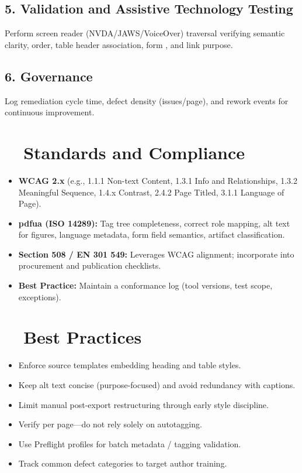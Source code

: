 \subsection*{5. Validation and Assistive Technology Testing}
Perform screen reader (NVDA/JAWS/VoiceOver) traversal verifying semantic clarity, order, table header association, form , and link purpose.
\subsection*{6. Governance}
Log remediation cycle time, defect density (issues/page), and rework events for continuous improvement.

\section{~~Standards and Compliance}\label{ch17:sec:standards-compliance}
\begin{itemize}
	\item \textbf{WCAG 2.x} (e.g., 1.1.1 Non-text Content, 1.3.1 Info and Relationships, 1.3.2 Meaningful Sequence, 1.4.x Contrast, 2.4.2 Page Titled, 3.1.1 Language of Page).
	\item \textbf{\gls{pdfua} (ISO 14289):} Tag tree completeness, correct role mapping, alt text for figures, language metadata, form field semantics, artifact classification.
	\item \textbf{Section 508 / EN 301 549:} Leverages WCAG alignment; incorporate into procurement and publication checklists.
	\item \textbf{Best Practice:} Maintain a conformance log (tool versions, test scope, exceptions).
\end{itemize}

\section{~~Best Practices}\label{ch17:sec:best-practices}
\begin{itemize}
	\item Enforce source templates embedding heading and table styles.
	\item Keep alt text concise (purpose-focused) and avoid redundancy with captions.
	\item Limit manual post-export restructuring through early style discipline.
	\item Verify  per page—do not rely solely on autotagging.
	\item Use Preflight profiles for batch metadata / tagging validation.
	\item Track common defect categories to target author training.
\end{itemize}

